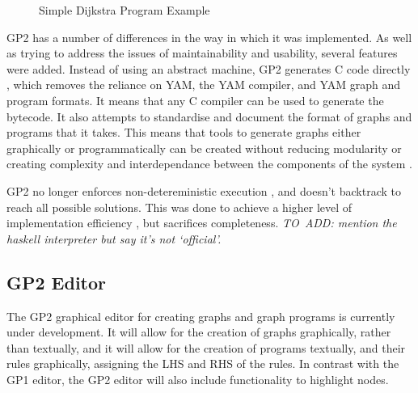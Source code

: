 \documentclass{UoYCSproject}
\begin{document}
\begin{figure}
\caption{Simple Dijkstra Program Example}
\end{figure}


GP2 has a number of differences in the way in which it was implemented. As well as trying to address the issues of maintainability and usability, several features were added.
Instead of using an abstract machine, GP2 generates C code directly \cite{chris_compiler}, which removes the reliance on YAM, the YAM compiler, and YAM graph and program formats. It means that any C compiler can be used to generate the bytecode. It also attempts to standardise and document the format of graphs and programs that it takes. This means that tools to generate graphs either graphically or programmatically can be created without reducing modularity or creating complexity and interdependance between the components of the system \cite{gp2_ide}.

GP2 no longer enforces non-detereministic execution \cite[p. 15]{gp2_ide}, and doesn't backtrack to reach all possible solutions. This was done to achieve a higher level of implementation efficiency \cite[p. 15]{chris_compiler}, but sacrifices completeness.
\emph{TO~ADD: mention the haskell interpreter but say it's not `official'.} %

\subsection{GP2 Editor}
The GP2 graphical editor for creating graphs and graph programs is currently under development. It will allow for the creation of graphs graphically, rather than textually, and it will allow for the creation of programs textually, and their rules graphically, assigning the LHS and RHS of the rules. In contrast with the GP1 editor, the GP2 editor will also include functionality to highlight nodes.
\end{document}
